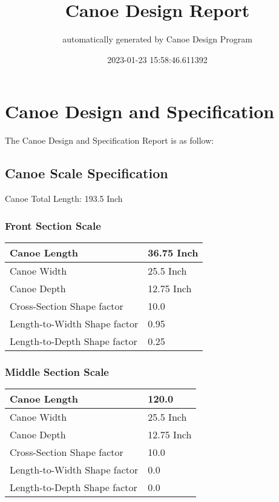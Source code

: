 \documentclass{article}%
\title{Canoe Design Report}%
\author{automatically generated by Canoe Design Program}%
\date{2023{-}01{-}23 15:58:46.611392}%
\begin{document}
%
\normalsize%
\selectfont%
\fontsize{12}{15}%
\pagestyle{fancy}%
\maketitle%
\thispagestyle{fancy}%
\section{Canoe Design and Specification}%
\label{sec:CanoeDesignandSpecification}%
The Canoe Design and Specification Report is as follow: %
\subsection{Canoe Scale Specification}%
\label{subsec:CanoeScaleSpecification}%
Canoe Total Length: 193.5 Inch%
\subsubsection{Front Section Scale}%
\label{ssubsec:FrontSectionScale}%
\renewcommand{\arraystretch}{1.5}%
\begin{tabular}{|l|l|}%
\hline%
Canoe Length&36.75 Inch\\%
\hline%
Canoe Width&25.5 Inch\\%
\hline%
Canoe Depth&12.75 Inch\\%
\hline%
Cross{-}Section Shape factor&10.0\\%
\hline%
Length{-}to{-}Width Shape factor&0.95\\%
\hline%
Length{-}to{-}Depth Shape factor&0.25\\%
\hline%
\end{tabular}

%
\subsubsection{Middle Section Scale}%
\label{ssubsec:MiddleSectionScale}%
\renewcommand{\arraystretch}{1.5}%
\begin{tabular}{|l|l|}%
\hline%
Canoe Length&120.0\\%
\hline%
Canoe Width&25.5 Inch\\%
\hline%
Canoe Depth&12.75 Inch\\%
\hline%
Cross{-}Section Shape factor&10.0\\%
\hline%
Length{-}to{-}Width Shape factor&0.0\\%
\hline%
Length{-}to{-}Depth Shape factor&0.0\\%
\hline%
\end{tabular}
\end{document}
